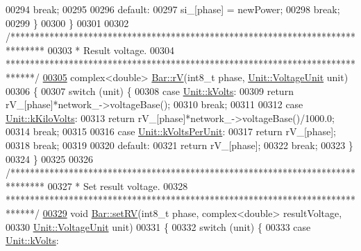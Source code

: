 \begin{DoxyCode}
00294     \textcolor{keywordflow}{break};
00295 
00296   \textcolor{keywordflow}{default}:
00297     si\_[phase] = newPower;
00298     \textcolor{keywordflow}{break};
00299   \}
00300 \}
00301 
00302 \textcolor{comment}{/*******************************************************************************}
00303 \textcolor{comment}{ * Result voltage.}
00304 \textcolor{comment}{ ******************************************************************************/}
\hypertarget{bar_8cpp_source_l00305}{}\hyperlink{group___models_ga6c83eb997f5038e0b9bbd5472582e0a8}{00305} complex<double> \hyperlink{group___models_ga6c83eb997f5038e0b9bbd5472582e0a8}{Bar::rV}(int8\_t phase, \hyperlink{class_unit_a55b07dfa9457e1eca2c7194fe0cfc3c1}{Unit::VoltageUnit} unit)
00306 \{
00307   \textcolor{keywordflow}{switch} (unit) \{
00308   \textcolor{keywordflow}{case} \hyperlink{class_unit_a55b07dfa9457e1eca2c7194fe0cfc3c1aa54b2473993a702a3923525765bd6e4c}{Unit::kVolts}:
00309     \textcolor{keywordflow}{return} rV\_[phase]*network\_->voltageBase();
00310     \textcolor{keywordflow}{break};
00311 
00312   \textcolor{keywordflow}{case} \hyperlink{class_unit_a55b07dfa9457e1eca2c7194fe0cfc3c1a35a201a658c2cd89766787c657e9a54d}{Unit::kKiloVolts}:
00313     \textcolor{keywordflow}{return} rV\_[phase]*network\_->voltageBase()/1000.0;
00314     \textcolor{keywordflow}{break};
00315 
00316   \textcolor{keywordflow}{case} \hyperlink{class_unit_a55b07dfa9457e1eca2c7194fe0cfc3c1ab44b1310b59fdcdc9df5bbea91da4206}{Unit::kVoltsPerUnit}:
00317     \textcolor{keywordflow}{return} rV\_[phase];
00318     \textcolor{keywordflow}{break};
00319 
00320   \textcolor{keywordflow}{default}:
00321     \textcolor{keywordflow}{return} rV\_[phase];
00322     \textcolor{keywordflow}{break};
00323   \}
00324 \}
00325 
00326 \textcolor{comment}{/*******************************************************************************}
00327 \textcolor{comment}{ * Set result voltage.}
00328 \textcolor{comment}{ ******************************************************************************/}
\hypertarget{bar_8cpp_source_l00329}{}\hyperlink{group___models_ga96ab396a6e953a0356f60adb1784ee37}{00329} \textcolor{keywordtype}{void} \hyperlink{group___models_ga96ab396a6e953a0356f60adb1784ee37}{Bar::setRV}(int8\_t phase, complex<double> resultVoltage,
00330                 \hyperlink{class_unit_a55b07dfa9457e1eca2c7194fe0cfc3c1}{Unit::VoltageUnit} unit)
00331 \{
00332   \textcolor{keywordflow}{switch} (unit) \{
00333   \textcolor{keywordflow}{case} \hyperlink{class_unit_a55b07dfa9457e1eca2c7194fe0cfc3c1aa54b2473993a702a3923525765bd6e4c}{Unit::kVolts}:

\end{DoxyCode}
